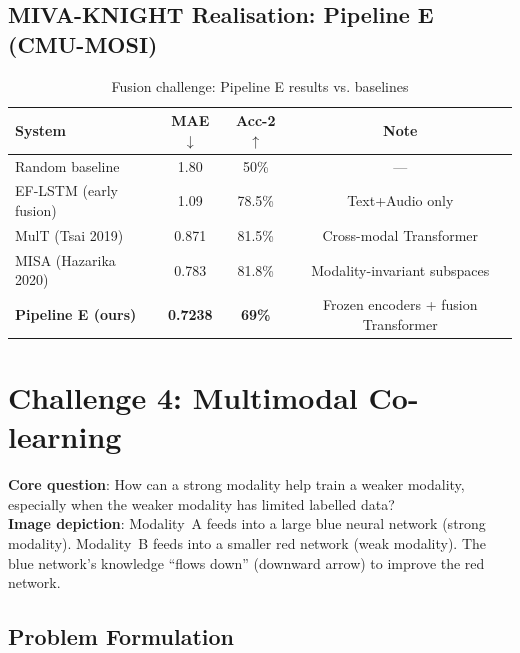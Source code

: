 \documentclass[12pt,a4paper]{article}
\theoremstyle{definition}
\theoremstyle{plain}
\theoremstyle{remark}
\begin{document}
\subsection{MIVA-KNIGHT Realisation: Pipeline E (CMU-MOSI)}

\begin{table}[H]
\centering
\caption{Fusion challenge: Pipeline E results vs. baselines}
\begin{tabular}{lccc}
\toprule
\textbf{System} & \textbf{MAE}$\downarrow$ & \textbf{Acc-2}$\uparrow$ & \textbf{Note} \\
\midrule
Random baseline & 1.80 & 50\% & — \\
EF-LSTM (early fusion) & 1.09 & 78.5\% & Text+Audio only \\
MulT (Tsai 2019) & 0.871 & 81.5\% & Cross-modal Transformer \\
MISA (Hazarika 2020) & 0.783 & 81.8\% & Modality-invariant subspaces \\
\textbf{Pipeline E (ours)} & \textbf{0.7238} & \textbf{69\%} & Frozen encoders + fusion Transformer \\
\bottomrule
\end{tabular}
\end{table}

\newpage
\section{Challenge 4: Multimodal Co-learning}
\label{sec:colearn}

\begin{tcolorbox}[challengebox,title={Challenge 4: Co-learning}]
\textbf{Core question}: How can a strong modality help train a weaker modality, especially when the weaker modality has limited labelled data?\\[4pt]
\textbf{Image depiction}: Modality~A feeds into a large blue neural network (strong modality). Modality~B feeds into a smaller red network (weak modality). The blue network's knowledge ``flows down'' (downward arrow) to improve the red network.
\end{tcolorbox}

\subsection{Problem Formulation}
\end{document}
